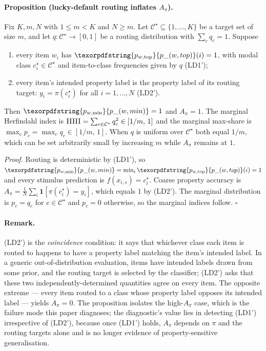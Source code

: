 \documentclass[11pt,letterpaper]{article}
\newcommand{\pwtop}{\texorpdfstring{\ensuremath{p_{w,\text{top}}}}{p\_(w,top)}}
\newcommand{\pwmin}{\texorpdfstring{\ensuremath{p_{w,\min}}}{p\_(w,min)}}
\newcommand{\hhi}{\textsc{HHI}}
\begin{document}
\paragraph{Proposition (lucky-default routing inflates
$A_\pi$).} Fix $K, m, N$ with $1 \leq m < K$ and $N \geq m$. Let
$\mathcal{C}^\star \subseteq \{1, \ldots, K\}$ be a target set of
size $m$, and let $q: \mathcal{C}^\star \to [0, 1]$ be a routing
distribution with $\sum_c q_c = 1$. Suppose
\begin{enumerate}[label=(\arabic*),leftmargin=2em]
  \item every item $w_i$ has $\pwtop(i) = 1$, with modal class
        $c^\star_i \in \mathcal{C}^\star$ and item-to-class
        frequencies given by $q$ (LD1');
  \item every item's intended property label is the property label
        of its routing target: $y_i = \pi(c^\star_i)$ for all
        $i = 1, \ldots, N$ (LD2').
\end{enumerate}
Then $\pwmin = 1$ and $A_\pi = 1$. The marginal Herfindahl index is
$\hhi = \sum_{c \in \mathcal{C}^\star} q_c^2 \in [1/m,\, 1]$ and
the marginal max-share is
$\max_c p_c = \max_c q_c \in [1/m,\, 1]$. When $q$ is uniform over
$\mathcal{C}^\star$ both equal $1/m$, which can be set arbitrarily
small by increasing $m$ while $A_\pi$ remains at $1$.

\emph{Proof.} Routing is deterministic by (LD1'), so
$\pwmin = \min_i \pwtop(i) = 1$ and every stimulus prediction is
$f(x_{i,s}) = c^\star_i$. Coarse property accuracy is
$A_\pi = \tfrac{1}{N} \sum_i \mathbf{1}[\pi(c^\star_i) = y_i]$,
which equals $1$ by (LD2'). The marginal distribution is
$p_c = q_c$ for $c \in \mathcal{C}^\star$ and $p_c = 0$ otherwise,
so the marginal indices follow. $\square$

\paragraph{Remark.} (LD2') is the \emph{coincidence} condition: it
says that whichever class each item is routed to happens to have a
property label matching the item's intended label. In a generic
out-of-distribution evaluation, items have intended labels drawn
from some prior, and the routing target is selected by the
classifier; (LD2') asks that these two independently-determined
quantities agree on every item. The opposite extreme --- every item
routed to a class whose property label opposes its intended label
--- yields $A_\pi = 0$. The proposition isolates the high-$A_\pi$
case, which is the failure mode this paper diagnoses; the
diagnostic's value lies in detecting (LD1') irrespective of (LD2'),
because once (LD1') holds, $A_\pi$ depends on $\pi$ and the routing
targets alone and is no longer evidence of property-sensitive
generalisation.
\end{document}
